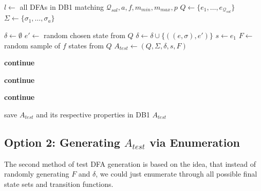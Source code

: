 \vspace{0.2cm}
\begin{algorithmic}[1]
	
		\vspace{0.2cm}
	
		\State $l \gets$ all DFAs in DB1 matching $\mathcal{Q}_{sol}, a, f, m_{min}, m_{max}, p$
		\State $Q \gets \{e_1, \ldots, e_{\mathcal{Q}_{sol}}\}$
		\State $\Sigma \gets \{\sigma_1, \ldots, \sigma_a\}$
		
		\vspace{0.2cm}
		
		
		\vspace{0.2cm}
		
			\State $\delta \gets \emptyset$
					\State $e' \gets$ random chosen state from $Q$
					\State $\delta \gets \delta \cup \{((e,\sigma),e')\}$
				\EndFor
			\EndFor
			\State $s \gets e_1$
			\State $F \gets$ random sample of $f$ states from $Q$
			\State $A_{test} \gets (Q, \Sigma, \delta, s, F)$
			
			\vspace{0.2cm}
			
			\State \textbf{continue}
			\EndIf
			
			\State \textbf{continue}
			\EndIf
			
			\State \textbf{continue}
			\EndIf
			
			\vspace{0.2cm}
			
			\State save $A_{test}$ and its respective properties in DB1
			\State\Return $A_{test}$
		\EndWhile
	\EndFunction
\end{algorithmic}
\vspace{0.2cm}

\subsection{Option 2: Generating $A_{test}$ via Enumeration}


The second method of test DFA generation is based on the idea, that instead of randomly generating $F$ and $\delta$, we could just enumerate through all possible final state sets and transition functions.

